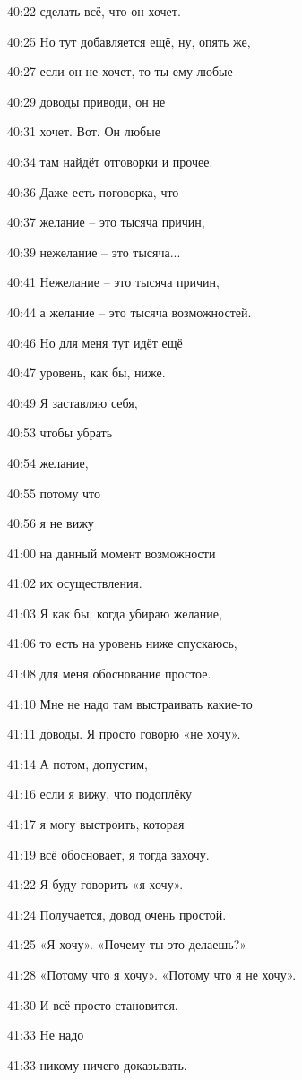 40:22
сделать всё, что он хочет.

40:25
Но тут добавляется ещё, ну, опять же,

40:27
если он не хочет, то ты ему любые

40:29
доводы приводи, он не

40:31
хочет. Вот. Он любые

40:34
там найдёт отговорки и прочее.

40:36
Даже есть поговорка, что

40:37
желание – это тысяча причин,

40:39
нежелание – это тысяча...

40:41
Нежелание – это тысяча причин,

40:44
а желание – это тысяча возможностей.

40:46
Но для меня тут идёт ещё

40:47
уровень, как бы, ниже.

40:49
Я заставляю себя,

40:53
чтобы убрать

40:54
желание,

40:55
потому что

40:56
я не вижу

41:00
на данный момент возможности

41:02
их осуществления.

41:03
Я как бы, когда убираю желание,

41:06
то есть на уровень ниже спускаюсь,

41:08
для меня обоснование простое.

41:10
Мне не надо там выстраивать какие-то

41:11
доводы. Я просто говорю «не хочу».

41:14
А потом, допустим,

41:16
если я вижу, что подоплёку

41:17
я могу выстроить, которая

41:19
всё обосновает, я тогда захочу.

41:22
Я буду говорить «я хочу».

41:24
Получается, довод очень простой.

41:25
«Я хочу». «Почему ты это делаешь?»

41:28
«Потому что я хочу». «Потому что я не хочу».

41:30
И всё просто становится.

41:33
Не надо

41:33
никому ничего доказывать.

